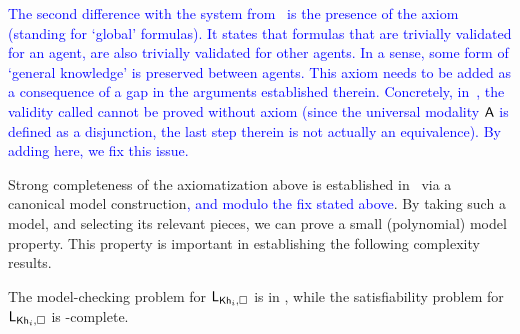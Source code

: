 \textcolor{blue}{The second difference with the system from~\cite{AFSVQ23report} is the presence of the axiom  (standing for `global' formulas). It states that formulas that are trivially validated for an agent, are also trivially validated for other agents. In a sense, some form of `general knowledge' is preserved between agents. This axiom needs to be added as a consequence of a gap in the arguments established therein. Concretely, in~\cite[Prop.~4]{AFSVQ23report}, the validity called  cannot be proved without axiom  (since the universal modality ${\sf A}$ is defined as a disjunction, the last step therein is not actually an equivalence). By adding  here, we fix this issue.}


Strong completeness of the axiomatization above is established in~\cite{AFSVQ21,AFSVQ23report} via a canonical model construction\textcolor{blue}{, and modulo the fix stated above}. By taking such a model, and selecting its relevant pieces, we can prove a small (polynomial) model property. This property is important in establishing the following complexity results.

\medskip 

\begin{theorem}
    The model-checking problem for $\mathsf{L}_{{\sf Kh}_i,\square}$ is in \Poly, while the satisfiability problem for $\mathsf{L}_{{\sf Kh}_i,\square}$ is \NP-complete.
\end{theorem}





